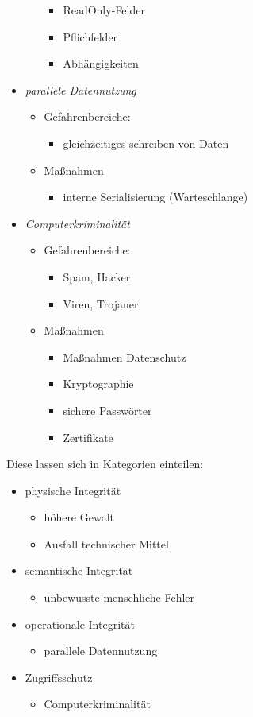 \begin{itemize}
\begin{itemize}
\begin{itemize}
\item ReadOnly-Felder
\item Pflichfelder
\item Abhängigkeiten
\end{itemize}
\end{itemize}
\item \emph{parallele Datennutzung}
\begin{itemize}
\item Gefahrenbereiche:
\begin{itemize}
\item gleichzeitiges schreiben von Daten
\end{itemize}
\item Maßnahmen
\begin{itemize}
\item interne Serialisierung (Warteschlange)
\end{itemize}
\end{itemize}
\item \emph{Computerkriminalität}
\begin{itemize}
\item Gefahrenbereiche:
\begin{itemize}
\item Spam, Hacker
\item Viren, Trojaner
\end{itemize}
\item Maßnahmen
\begin{itemize}
\item Maßnahmen Datenschutz
\item Kryptographie
\item sichere Passwörter
\item Zertifikate
\end{itemize}
\end{itemize}
\end{itemize}
Diese lassen sich in Kategorien einteilen:
\begin{itemize}
\item physische Integrität
\begin{itemize}
\item höhere Gewalt
\item Ausfall technischer Mittel
\end{itemize}
\item semantische Integrität
\begin{itemize}
\item unbewusste menschliche Fehler
\end{itemize}
\item operationale Integrität
\begin{itemize}
\item parallele Datennutzung
\end{itemize}
\item Zugriffsschutz
\begin{itemize}
\item Computerkriminalität
\end{itemize}
\end{itemize}
